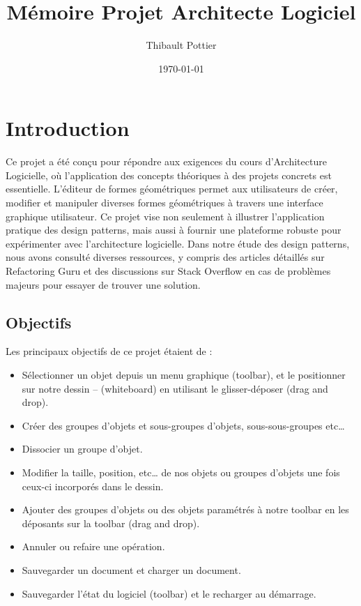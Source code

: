 \documentclass[a4paper,11pt]{article}
\title{Mémoire Projet Architecte Logiciel}
\author{Thibault Pottier}
\date{\today}
\begin{document}
\begin{titlepage}
      \maketitle
\end{titlepage}

\hypertarget{TabMatiere}{\tableofcontents}
\vspace{1cm}

\pagebreak

\section{Introduction}
    Ce projet a été conçu pour répondre aux exigences du cours d'Architecture Logicielle, où l'application des concepts théoriques à des projets concrets est essentielle. L'éditeur de formes géométriques permet aux utilisateurs de créer, modifier et manipuler diverses formes géométriques à travers une interface graphique utilisateur. Ce projet vise non seulement à illustrer l'application pratique des design patterns, mais aussi à fournir une plateforme robuste pour expérimenter avec l'architecture logicielle.
    Dans notre étude des design patterns, nous avons consulté diverses ressources, y compris des articles détaillés sur Refactoring Guru \cite{refactoringGuru} et des discussions sur Stack Overflow \cite{stackoverflow} en cas de problèmes majeurs pour essayer de trouver une solution.

\subsection{Objectifs}
    Les principaux objectifs de ce projet étaient de :
    \begin{itemize}
        \item Sélectionner un objet depuis un menu graphique (toolbar), et le positionner sur notre dessin – (whiteboard) en utilisant le glisser-déposer (drag and drop).
        \item Créer des groupes d’objets et sous-groupes d’objets, sous-sous-groupes etc…
        \item Dissocier un groupe d’objet.
        \item Modifier la taille, position, etc… de nos objets ou groupes d’objets une fois ceux-ci incorporés dans le dessin.
        \item Ajouter des groupes d’objets ou des objets paramétrés à notre toolbar en les déposants sur la toolbar (drag and drop).
        \item Annuler ou refaire une opération.
        \item Sauvegarder un document et charger un document.
        \item Sauvegarder l’état du logiciel (toolbar) et le recharger au démarrage.
    \end{itemize}
\end{document}

